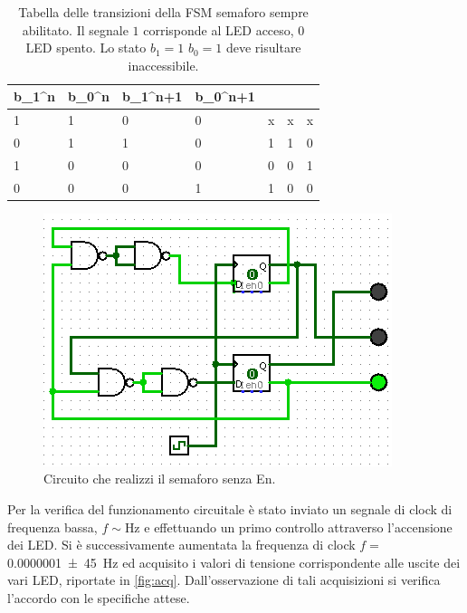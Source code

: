 \documentclass[a4paper,11pt]{article}
\begin{document}
\begin{table}[h]
\centering
\begin{tabular}{ss|ss|sss}
	\toprule
	b_{1}^{n} & b_{0}^{n}  & b_{1}^{n+1} & b_{0}^{n+1} &  &  &  \\
	 & 1 & 0 & 0 & x & x& x\\
	 0 & 1 & 1 & 0 & 1 & 1& 0\\
	 1 & 0 & 0 & 0 & 0 & 0& 1\\
	 0 & 0 & 0 & 1 & 1 & 0& 0\\
	\bottomrule
\end{tabular}
\caption{Tabella delle transizioni della FSM semaforo sempre abilitato.
Il segnale $1$ corrisponde al LED acceso, $0$ LED spento.
Lo stato $b_{1}=1$ $b_{0}=1$ deve risultare inaccessibile. }
\label{tab:tran}
\end{table}

\begin{figure}[h!]
		\centering
		\includegraphics[scale=1.0]{circ1.png}
		\caption{Circuito che realizzi il semaforo senza En.}
		\label{fig:sem1}
	\end{figure}

Per la verifica del funzionamento circuitale è stato 
 inviato un segnale di clock di frequenza bassa, $f\sim $\si{\hertz} e effettuando un primo controllo attraverso l'accensione dei LED. Si è successivamente aumentata la frequenza di clock $f= $\SI{.0000001\pm 45}{\hertz}
 ed acquisito i valori di tensione corrispondente alle uscite dei vari LED, riportate in 
 \figurename{ \ref{fig:acq}}. Dall'osservazione di
  tali acquisizioni si verifica l'accordo con le specifiche attese. 
 
\end{document}
